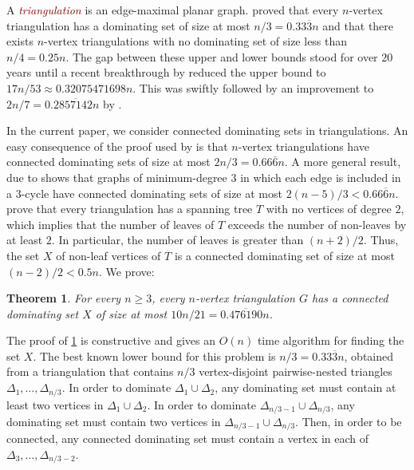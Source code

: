 \documentclass{article}
\newtheorem{thm}{Theorem}
\newcommand{\defin}[1]{\emph{\textcolor{Maroon}{#1}}}
\theoremstyle{definition}
\begin{document}
A \defin{triangulation} is an edge-maximal planar graph.  \citet{matheson.tarjan:dominating} proved that every $n$-vertex triangulation has a dominating set of size at most $n/3=0.33\overline{3}n$ and that there exists $n$-vertex triangulations with no dominating set of size less than $n/4=0.25n$. The gap between these upper and lower bounds stood for over $20$ years until a recent breakthrough by \citet{spacapan:domination} reduced the upper bound to $17n/53\approx 0.32075471698n$.  This was swiftly followed by an improvement to $2n/7= 0.2\overline{857142}n$ by \citet{christiansen.rotenberg.ea:triangulations}.

In the current paper, we consider connected dominating sets in triangulations.  An easy consequence of the proof used by \citet{matheson.tarjan:dominating} is that $n$-vertex triangulations have connected dominating sets of size at most $2n/3=0.66\overline{6}n$.  A more general result, due to  \citet{kleitman.west:spanning} shows that graphs of minimum-degree $3$ in which each edge is included in a $3$-cycle have connected dominating sets of size at most $2(n-5)/3<0.66\overline{6}n$. \citet{albertson.berman.ea:graphs} prove that every triangulation has a spanning tree $T$ with no vertices of degree $2$, which implies that the number of leaves of $T$ exceeds the number of non-leaves by at least $2$.  In particular, the number of leaves is greater than $(n+2)/2$. Thus, the set $X$ of non-leaf vertices of $T$ is a connected dominating set of size at most $(n-2)/2<0.5n$. We prove:

\begin{thm}\label{main_result2}
  For every $n\ge 3$, every $n$-vertex triangulation $G$ has a connected dominating set $X$ of size at most $10n/21= 0.\overline{476190}n$.
\end{thm}

The proof of \cref{main_result2} is constructive and gives an $O(n)$ time algorithm for finding the set $X$.  The best known lower bound for this problem is $n/3 = 0.33\overline{3} n$, obtained from a triangulation that contains $n/3$ vertex-disjoint pairwise-nested triangles $\Delta_1,\ldots,\Delta_{n/3}$.  In order to dominate $\Delta_1\cup \Delta_2$, any dominating set must contain at least two vertices in $\Delta_1 \cup \Delta_2$. In order to dominate $\Delta_{n/3-1}\cup \Delta_{n/3}$, any dominating set must contain two vertices in $\Delta_{n/3-1}\cup\Delta_{n/3}$.  Then, in order to be connected, any connected dominating set must contain a vertex in each of $\Delta_3,\ldots,\Delta_{n/3-2}$.
\end{document}
